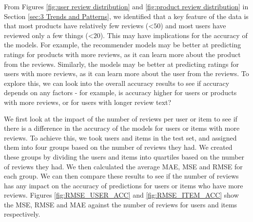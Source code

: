 From Figures \ref{fig:user review distribution} and \ref{fig:product review distribution} in Section \ref{sec:3 Trends and Patterns}, we identified that a key feature of the data is that most products have relatively few reviews (<$50$) and most users have reviewed only a few things (<$20$). This may have implications for the accuracy of the models. For example, the recommender models may be better at predicting ratings for products with more reviews, as it can learn more about the product from the reviews. Similarly, the models may be better at predicting ratings for users with more reviews, as it can learn more about the user from the reviews. To explore this, we can look into the overall accuracy results to see if accuracy depends on any factors - for example, is accuracy higher for users or products with more reviews, or for users with longer review text?

We first look at the impact of the number of reviews per user or item to see if there is a difference in the accuracy of the models for users or items with more reviews. To achieve this, we took users and items in the test set, and assigned them into four groups based on the number of reviews they had. We created these groups by dividing the users and items into quartiles based on the number of reviews they had. We then calculated the average MAE, MSE and RMSE for each group. We can then compare these results to see if the number of reviews has any impact on the accuracy of predictions for users or items who have more reviews. Figures \ref{fig:RMSE_USER_ACC} and \ref{fig:RMSE_ITEM_ACC} show the MSE, RMSE and MAE against the number of reviews for users and items respectively. 

